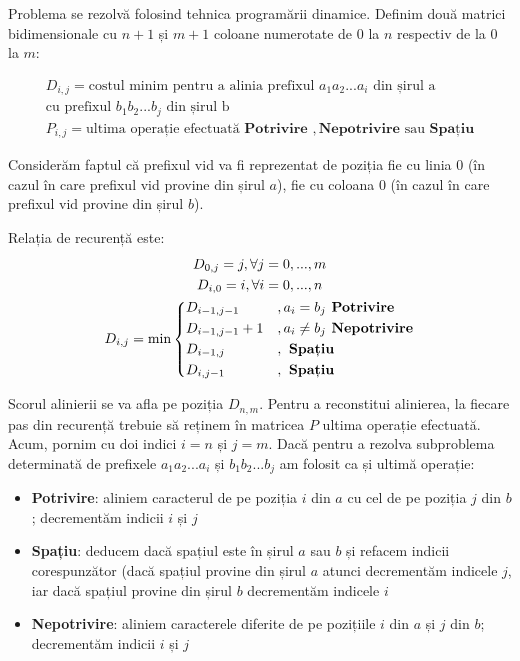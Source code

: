 Problema se rezolvă folosind tehnica programării dinamice. Definim
două matrici bidimensionale cu $n+1$ și $m+1$ coloane numerotate de $0$ la $n$ respectiv de la $0$
la $m$:

\begin{gather*}
  D_{i,j} = \text{costul minim pentru a alinia prefixul } a_1a_2...a_i \text{ din șirul a} \\
  \text{cu prefixul } b_1b_2...b_j \text{ din șirul b} \\
  P_{i,j} = \text{ultima operație efectuată } \textbf{Potrivire }, \textbf{Nepotrivire } \text{sau} 
  \textbf{ Spațiu}
\end{gather*}

Considerăm faptul că prefixul vid va fi reprezentat de poziția fie cu linia $0$ (în cazul în care
prefixul vid provine din șirul $a$), fie cu coloana $0$ (în cazul în care prefixul vid provine
din șirul $b$).

Relația de recurență este:
\begin{gather*}
  D_{0,j} = j, \forall j=0,...,m \\
  D_{i,0} = i, \forall i=0,...,n \\
  D_{i,j} = \min \begin{dcases}
      D_{i-1,j-1}       &, a_i=b_j \textbf{ Potrivire} \\
      D_{i-1,j-1}+1     &, a_i \neq b_j \textbf{ Nepotrivire} \\
      D_{i-1,j}         &, \textbf{ Spațiu} \\
      D_{i,j-1}         &, \textbf{ Spațiu} \\
    \end{dcases}
\end{gather*}

Scorul alinierii se va afla pe poziția $D_{n,m}$. Pentru a reconstitui alinierea, la fiecare pas din 
recurență trebuie să reținem în matricea $P$ ultima operație efectuată. Acum, pornim cu doi
indici $i = n$ și $j = m$. Dacă pentru a rezolva subproblema determinată de prefixele $a_1a_2...a_i$
și $b_1b_2...b_j$ am folosit ca și ultimă operație:

\begin{itemize}
  \item \textbf{Potrivire}: aliniem caracterul de pe poziția $i$ din $a$ cu cel de pe poziția $j$ 
    din $b$; decrementăm indicii $i$ și $j$  
  \item \textbf{Spațiu}: deducem dacă spațiul este în șirul $a$ sau $b$ și refacem indicii corespunzător
    (dacă spațiul provine din șirul $a$ atunci decrementăm indicele $j$, iar dacă spațiul provine
    din șirul $b$ decrementăm indicele $i$
  \item \textbf{Nepotrivire}: aliniem caracterele diferite de pe pozițiile $i$ din $a$ și $j$ din $b$;
    decrementăm indicii $i$ și $j$
\end{itemize}

